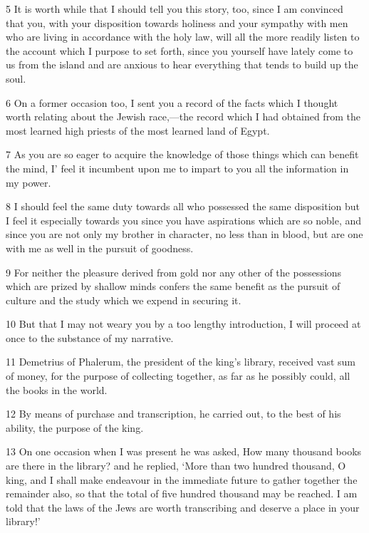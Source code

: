 \par 5 It is worth while that I should tell you this story, too, since I am convinced that you, with your disposition towards holiness and your sympathy with men who are living in accordance with the holy law, will all the more readily listen to the account which I purpose to set forth, since you yourself have lately come to us from the island and are anxious to hear everything that tends to build up the soul.

\par 6 On a former occasion too, I sent you a record of the facts which I thought worth relating about the Jewish race,—the record which I had obtained from the most learned high priests of the most learned land of Egypt.

\par 7 As you are so eager to acquire the knowledge of those things which can benefit the mind, I' feel it incumbent upon me to impart to you all the information in my power.

\par 8 I should feel the same duty towards all who possessed the same disposition but I feel it especially towards you since you have aspirations which are so noble, and since you are not only my brother in character, no less than in blood, but are one with me as well in the pursuit of goodness.

\par 9 For neither the pleasure derived from gold nor any other of the possessions which are prized by shallow minds confers the same benefit as the pursuit of culture and the study which we expend in securing it.

\par 10 But that I may not weary you by a too lengthy introduction, I will proceed at once to the substance of my narrative.

\par 11 Demetrius of Phalerum, the president of the king's library, received vast sum of money, for the purpose of collecting together, as far as he possibly could, all the books in the world.

\par 12 By means of purchase and transcription, he carried out, to the best of his ability, the purpose of the king.

\par 13 On one occasion when I was present he was asked, How many thousand books are there in the library? and he replied, ‘More than two hundred thousand, O king, and I shall make endeavour in the immediate future to gather together the remainder also, so that the total of five hundred thousand may be reached. I am told that the laws of the Jews are worth transcribing and deserve a place in your library!’

